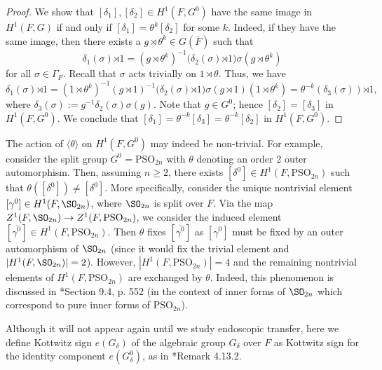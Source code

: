 \documentclass[11pt,letterpaper]{amsart}
\numberwithin{equation}{section}
\begin{document}
\begin{proof}
We show that $[\delta_1], [\delta_2] \in H^1(F,G^0)$ have the same image in $H^1(F,G)$ if and only if $[\delta_1]= \theta^k [\delta_2]$ for some $k$. Indeed, if they have the same image, then there exists a $g \rtimes \theta^k \in G(\overline{F})$ such that 
\[ \delta_1(\sigma){ \rtimes 1}= (g \rtimes \theta^k)^{-1} (\delta_2(\sigma){ \rtimes 1)} \sigma(g \rtimes \theta^k)\]
for all $\sigma \in \Gamma_F$. Recall that $\sigma$ acts trivially on $1 \rtimes \theta$. Thus, we have 
\[ \delta_1(\sigma){ \rtimes 1}= (1 \rtimes \theta^k)^{-1} (g\rtimes 1)^{-1} (\delta_2(\sigma){ \rtimes 1)} \sigma (g\rtimes 1)  (1\rtimes \theta^k)= \theta^{{-}k} ( \delta_3 (\sigma)){ \rtimes 1},\]
where $\delta_3(\sigma):= g^{-1} \delta_2(\sigma) \sigma(g)$. Note that $g \in G^0$; hence $[\delta_2]=[\delta_3]$ in $H^1(F,G^0)$.
We conclude that $[\delta_1]= \theta^{{-}k} [\delta_3]= \theta^{{-}k} [\delta_2]$ in $H^1(F,G^0)$.
\end{proof}

\begin{remark}    
    The action of ${\langle\theta\rangle}$ on $H^1(F,G^0)$ may indeed be non-trivial. For example, consider the split group $G^0 =\mathrm{PSO}_{2n}$ with $\theta$ denoting an order 2 outer automorphism. Then, assuming $n\geq 2$, there exists $[{\delta^0}]\in H^1(F,\mathrm{PSO}_{2n})$ such that $\theta([{\delta^0}])  \ne [{\delta^0}]$. More specifically, consider the unique nontrivial element $[\gamma^0]\in H^1(F,\SO_{2n})$, where $\SO_{2n}$ is split over $F$. Via the map $Z^1(F,\SO_{2n})\rightarrow Z^1(F,\mathrm{PSO}_{2n})$, we consider the induced element $[\overline{\gamma^0}]\in H^1(F,\mathrm{PSO}_{2n}).$ Then $\theta$ fixes $[\overline{\gamma^0}]$ as $[\gamma^0]$ must be fixed by an outer automorphism of $\SO_{2n}$ (since it would fix the trivial element and $|H^1(F,\SO_{2n})|=2$). However, $|H^1(F,\mathrm{PSO}_{2n})|=4$ and the remaining nontrivial elements of $H^1(F,\mathrm{PSO}_{2n})$ are exchanged by $\theta$. Indeed,
    this phenomenon is discussed in \cite{Art13}*{Section 9.4, p. 552} (in the context of inner forms of $\SO_{2n}$ which correspond to pure inner forms of $\mathrm{PSO}_{2n}$).
\end{remark}


Although it will not appear again until we study endoscopic transfer, 
here we define Kottwitz sign $e(G_\delta)$ of the algebraic group $G_\delta$ over $F$ as Kottwitz sign for the identity component $e(G_{\delta}^0)$, as in \cite{Kal26}*{Remark 4.13.2}. 
\end{document}
